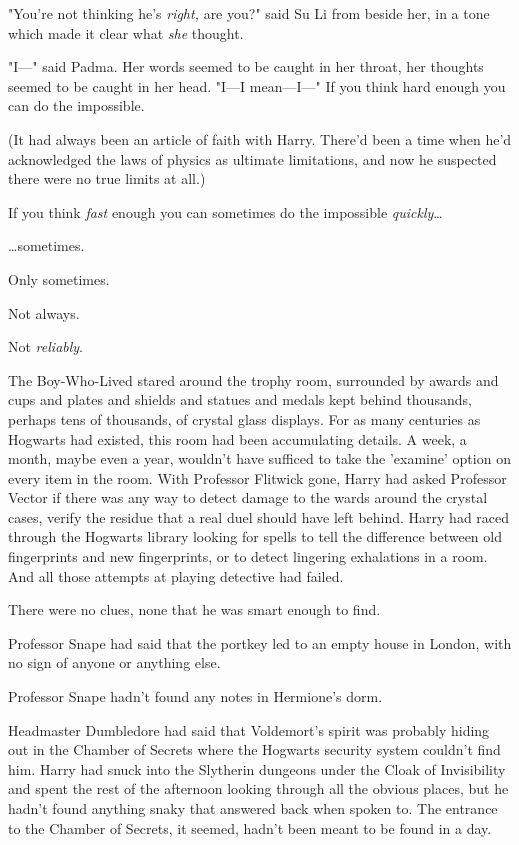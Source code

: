 "You're not thinking he's \emph{right,} are you?" said Su Li from beside her, 
in a tone which made it clear what \emph{she} thought.

"I---" said Padma. Her words seemed to be caught in her throat, her thoughts 
seemed to be caught in her head. "I---I mean---I---"
\sbreak
If you think hard enough you can do the impossible.

(It had always been an article of faith with Harry. There'd been a time when 
he'd acknowledged the laws of physics as ultimate limitations, and now he 
suspected there were no true limits at all.)

If you think \emph{fast} enough you can sometimes do the impossible 
\emph{quickly}{\ldots}

{\ldots}sometimes.

Only sometimes.

Not always.

Not \emph{reliably}.

The Boy-Who-Lived stared around the trophy room, surrounded by awards and cups 
and plates and shields and statues and medals kept behind thousands, perhaps 
tens of thousands, of crystal glass displays. For as many centuries as Hogwarts 
had existed, this room had been accumulating details. A week, a month, maybe 
even a year, wouldn't have sufficed to take the 'examine' option on every item 
in the room. With Professor Flitwick gone, Harry had asked Professor Vector if 
there was any way to detect damage to the wards around the crystal cases, 
verify the residue that a real duel should have left behind. Harry had raced 
through the Hogwarts library looking for spells to tell the difference between 
old fingerprints and new fingerprints, or to detect lingering exhalations in a 
room. And all those attempts at playing detective had failed.

There were no clues, none that he was smart enough to find.

Professor Snape had said that the portkey led to an empty house in London, with 
no sign of anyone or anything else.

Professor Snape hadn't found any notes in Hermione's dorm.

Headmaster Dumbledore had said that Voldemort's spirit was probably hiding out 
in the Chamber of Secrets where the Hogwarts security system couldn't find him. 
Harry had snuck into the Slytherin dungeons under the Cloak of Invisibility and 
spent the rest of the afternoon looking through all the obvious places, but he 
hadn't found anything snaky that answered back when spoken to. The entrance to 
the Chamber of Secrets, it seemed, hadn't been meant to be found in a day.

